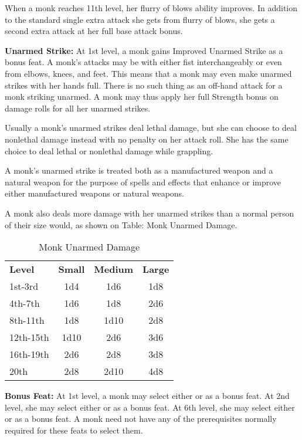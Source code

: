 When a monk reaches 11th level, her flurry of blows ability improves. In addition 
to the standard single extra attack she gets from flurry of blows, she gets a second 
extra attack at her full base attack bonus.

\textbf{Unarmed Strike:} At 1st level, a monk gains Improved Unarmed Strike as 
a bonus feat. A monk's attacks may be with either fist interchangeably or even 
from elbows, knees, and feet. This means that a monk may even make unarmed strikes 
with her hands full. There is no such thing as an off-hand attack for a monk striking 
unarmed. A monk may thus apply her full Strength bonus on damage rolls for all 
her unarmed strikes.

Usually a monk's unarmed strikes deal lethal damage, but she can choose to deal 
nonlethal damage instead with no penalty on her attack roll. She has the same choice 
to deal lethal or nonlethal damage while grappling.

A monk's unarmed strike is treated both as a manufactured weapon and a natural 
weapon for the purpose of spells and effects that enhance or improve either manufactured 
weapons or natural weapons.

A monk also deals more damage with her unarmed strikes than a normal person of their size would, 
as shown on Table: Monk Unarmed Damage.

\begin{table}[htb]
\caption{Monk Unarmed Damage}
\centering
\begin{tabular}{l c c c}
\textbf{Level} & \textbf{Small} & \textbf{Medium} & \textbf{Large}\\
1st-3rd & 1d4 & 1d6 & 1d8 \\
4th-7th & 1d6 & 1d8 & 2d6 \\
8th-11th & 1d8 & 1d10 & 2d8 \\
12th-15th & 1d10 & 2d6 & 3d6 \\
16th-19th & 2d6 & 2d8 & 3d8 \\
20th & 2d8 & 2d10 & 4d8 \\
\end{tabular}
\end{table}

\textbf{Bonus Feat:} At 1st level, a monk may select either  or 
 as a bonus feat. At 2nd level, she may select either  
or  as a bonus feat. At 6th level, she may select either 
or  as a bonus feat. A monk need not have any of the prerequisites 
normally required for these feats to select them.

